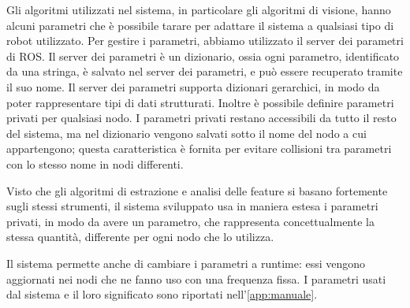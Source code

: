 Gli algoritmi utilizzati nel sistema, in particolare gli algoritmi di visione, hanno alcuni parametri che è possibile tarare per adattare il sistema a qualsiasi tipo di robot utilizzato.
Per gestire i parametri, abbiamo utilizzato il server dei parametri di ROS.
Il server dei parametri è un dizionario, ossia ogni parametro, identificato da una stringa, è salvato nel server dei parametri, e può essere recuperato tramite il suo nome. 
Il server dei parametri supporta dizionari gerarchici, in modo da poter rappresentare tipi di dati strutturati. 
Inoltre è possibile definire parametri privati per qualsiasi nodo. I parametri privati restano accessibili da tutto il resto del sistema, ma nel dizionario vengono salvati sotto il nome del nodo a cui appartengono; questa caratteristica è fornita per evitare collisioni tra parametri con lo stesso nome in nodi differenti.

Visto che gli algoritmi di estrazione e analisi delle feature si basano fortemente sugli stessi strumenti, il sistema sviluppato usa in maniera estesa i parametri privati, in modo da avere un parametro, che rappresenta concettualmente la stessa quantità, differente per ogni nodo che lo utilizza.

Il sistema permette anche di cambiare i parametri a runtime: essi vengono aggiornati nei nodi che ne fanno uso con una frequenza fissa.
I parametri usati dal sistema e il loro significato sono riportati nell'\autoref{app:manuale}.
